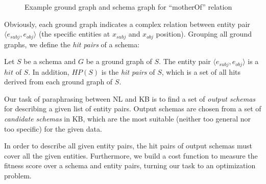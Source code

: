 \begin{figure}[h]
\centering
{}
\caption{Example ground graph and schema graph for ``motherOf'' relation}
\label{fig:schemaExample}
\end{figure}

Obviously, each ground graph indicates a complex relation between entity pair 
$\langle e_{subj}, e_{obj} \rangle$ (the specific entities at $x_{subj}$ and $x_{obj}$ position).
Grouping all ground graphs, we define the \textit{hit pairs} of a schema:

\begin{defn}
Let $S$ be a schema and $G$ be a ground graph of $S$. The entity pair $\langle e_{subj}, e_{obj} \rangle$
is a $hit$ of $S$. In addition, $HP(S)$ is the \textit{hit pairs} of $S$, which is a set of all hits derived from
each ground graph of $S$.
\end{defn}


%

Our task of paraphrasing between NL and KB is to find a set of \textit{output schemas} for
describing a given list of entity pairs.
Output schemas are chosen from a set of \textit{candidate schemas} in KB,
which are the most suitable (neither too general nor too specific) for the given data.

In order to describe all given entity pairs, the hit pairs of output schemas
must cover all the given entities.
Furthermore, we build a cost function to measure the fitness score over a schema and entity pairs,
turning our task to an optimization problem.

